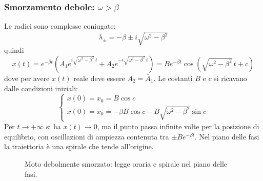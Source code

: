 \documentclass[11pt, a4paper, openright]{book}
\theoremstyle{plain}
\theoremstyle{definition}
\theoremstyle{remark}
\begin{document}
\subsubsection{Smorzamento debole: $\omega > \beta$}
Le radici sono complesse coniugate:
\begin{equation}
    \lambda_\pm = -\beta \pm i\sqrt{\omega^2 - \beta^2}
\end{equation}
quindi
\begin{equation}
    x(t) = e^{-\beta t}\left(A_1 e^{i\sqrt{\omega^2 - \beta^2}\,t} + A_2 e^{-i\sqrt{\omega^2 - \beta^2}\,t}\right) = B e^{-\beta t}\cos\left(\sqrt{\omega^2 - \beta^2}\,t + c\right)
\end{equation}
dove per avere $x(t)$ reale deve essere $A_2 = \bar{A}_1$. Le costanti $B$ e $c$ si ricavano dalle condizioni iniziali:
\begin{equation}
    \begin{cases}
        x(0) = x_0 = B\cos c \\
        \dot{x}(0) = \dot{x}_0 = -\beta B\cos c - B\sqrt{\omega^2 - \beta^2}\sin c
    \end{cases}
\end{equation}
Per $t \to +\infty$ si ha $x(t) \to 0$, ma il punto passa infinite volte per la posizione di equilibrio, con oscillazioni di ampiezza contenuta tra $\pm B e^{-\beta t}$. Nel piano delle fasi la traiettoria è una spirale che tende all'origine.

\begin{figure}[H]
    \centering
    \hspace{1cm}
    \caption{Moto debolmente smorzato: legge oraria e spirale nel piano delle fasi.}
\end{figure}
\end{document}
